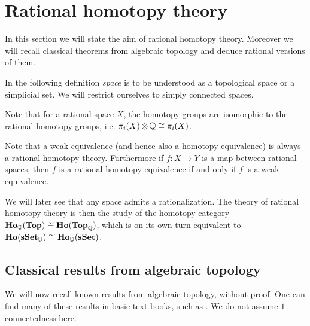 
\chapter{Rational homotopy theory}
\label{sec:basics}

In this section we will state the aim of rational homotopy theory. Moreover we will recall classical theorems from algebraic topology and deduce rational versions of them.

In the following definition \emph{space} is to be understood as a topological space or a simplicial set. We will restrict ourselves to simply connected spaces. 



Note that for a rational space $X$, the homotopy groups are isomorphic to the rational homotopy groups, i.e. $\pi_i(X) \operatorname*{\otimes} \mathbb{Q} \cong \pi_i(X)$.



Note that a weak equivalence (and hence also a homotopy equivalence) is always a rational homotopy theory. Furthermore if $f: X \to Y$ is a map between rational spaces, then $f$ is a rational homotopy equivalence if and only if $f$ is a weak equivalence.

We will later see that any space admits a rationalization. The theory of rational homotopy theory is then the study of the homotopy category $\mathbf{Ho}_{\mathbb{Q}}(\mathbf{Top}) \cong \mathbf{Ho}(\mathbf{Top}_{\mathbb{Q}})$, which is on its own turn equivalent to $\mathbf{Ho}(\mathbf{s{\mathbf{Set}}}_{\mathbb{Q}}) \cong \mathbf{Ho}_{\mathbb{Q}}(\mathbf{s{\mathbf{Set}}})$. 

\section{Classical results from algebraic topology}

We will now recall known results from algebraic topology, without proof. One can find many of these results in basic text books, such as \cite{may, dold}. We do not assume $1$-connectedness here.

